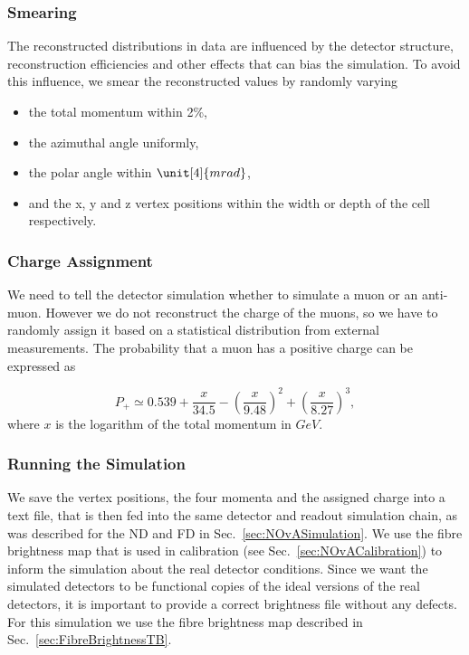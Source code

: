 \subsubsection*{Smearing}
The reconstructed distributions in data are influenced by the detector structure, reconstruction efficiencies and other effects that can bias the simulation. To avoid this influence, we smear the reconstructed values by randomly varying
\begin{itemize}
\item the total momentum within 2\%,
\item the azimuthal angle uniformly,
\item the polar angle within $\unit[4]{mrad}$,
\item and the x, y and z vertex positions within the width or depth of the cell respectively.
\end{itemize}

\subsubsection*{Charge Assignment}
We need to tell the detector simulation whether to simulate a muon or an anti-muon. However we do not reconstruct the charge of the muons, so we have to randomly assign it based on a statistical distribution from external measurements. The probability that a muon has a positive charge can be expressed as \cite{NOvA-doc-51327} 


\begin{equation}
P_+ \simeq 0.539 + \frac{x}{34.5}-\left(\frac{x}{9.48}\right)^2 + \left(\frac{x}{8.27}\right)^3,
\end{equation}
where $x$ is the logarithm of the total momentum in $\unit{GeV}$.

\subsubsection*{Running the Simulation}
We save the vertex positions, the four momenta and the assigned charge into a text file, that is then fed into the same detector and readout simulation chain, as was described for the \gls{ND} and \gls{FD} in Sec.~\ref{sec:NOvASimulation}.  We use the fibre brightness map that is used in calibration (see Sec.~\ref{sec:NOvACalibration}) to inform the simulation about the real detector conditions. Since we want the simulated detectors to be functional copies of the ideal versions of the real detectors, it is important to provide a correct brightness file without any defects. For this simulation we use the fibre brightness map described in Sec.~\ref{sec:FibreBrightnessTB}.

